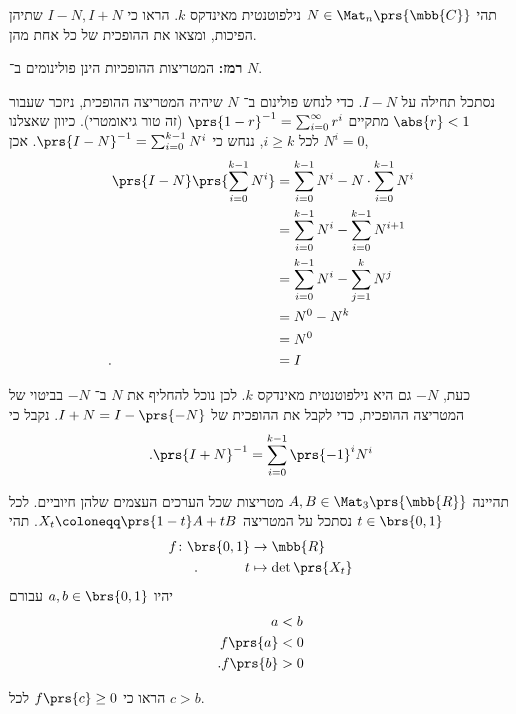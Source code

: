 \documentclass[a4paper,10pt,twoside,openany]{book}
\begin{document}
\begin{exercisechap}
תהי
$N \in \Mat_n\prs{\mbb{C}}$
נילפוטנטית מאינדקס
$k$.
הראו כי
$I - N, I + N$
שתיהן הפיכות, ומצאו את ההופכית של כל אחת מהן.

\textbf{רמז:}
המטריצות ההופכיות הינן פולינומים ב־%
$N$.
\end{exercisechap}

\begin{solution}
נסתכל תחילה על
$I - N$.
כדי לנחש פולינום ב־%
$N$
שיהיה המטריצה ההופכית, ניזכר שעבור
$\abs{r} < 1$
מתקיים
$\prs{1-r}^{-1} = \sum_{i = 0}^{\infty} r^i$
(זה טור גיאומטרי).
כיוון שאצלנו
$N^i = 0$
לכל
$i \geq k$,
ננחש כי
$\prs{I - N}^{-1} = \sum_{i=0}^{k-1} N^i$.
אכן,
\begin{align*}
\prs{I - N} \prs{\sum_{i=0}^{k-1} N^i} &= \sum_{i=0}^{k-1} N^i - N \cdot \sum_{i=0}^{k-1} N^i
\\&= \sum_{i=0}^{k-1} N^i - \sum_{i=0}^{k-1} N^{i+1}
\\&= \sum_{i=0}^{k-1} N^i - \sum_{j=1}^{k} N^j
\\&= N^0 - N^k
\\&= N^0
\\\text{.} \hphantom{\prs{I - N} \prs{\sum_{i=0}^{k-1} N^i}} &= I
\end{align*}

כעת,
$-N$
גם היא נילפוטנטית מאינדקס
$k$.
לכן נוכל להחליף את
$N$
ב־%
$-N$
בביטוי של המטריצה ההופכית, כדי לקבל את ההופכית של
$I + N = I - \prs{-N}$.
נקבל כי
\[\text{.} \prs{I + N}^{-1} = \sum_{i = 0}^{k-1} \prs{-1}^i N^i\]
\end{solution}

\begin{exercisechap}
תהיינה
$A,B \in \Mat_3\prs{\mbb{R}}$
מטריצות שכל הערכים העצמים שלהן חיוביים.
לכל
$t \in \brs{0,1}$
נסתכל על המטריצה
$X_t \coloneqq \prs{1-t} A + t B$.
תהי
\begin{align*}
f \colon \brs{0,1} &\to \mbb{R} \\
\text{.} \hphantom{lalalala} t &\mapsto \det\prs{X_t}
\end{align*}
יהיו
$a,b \in \brs{0,1}$
עבורם
\begin{align*}
a &< b \\
f\prs{a} &< 0 \\
\text{.} f\prs{b} &> 0
\end{align*}

הראו כי
$f\prs{c} \geq 0$
לכל
$c > b$.
\end{exercisechap}
\end{document}
